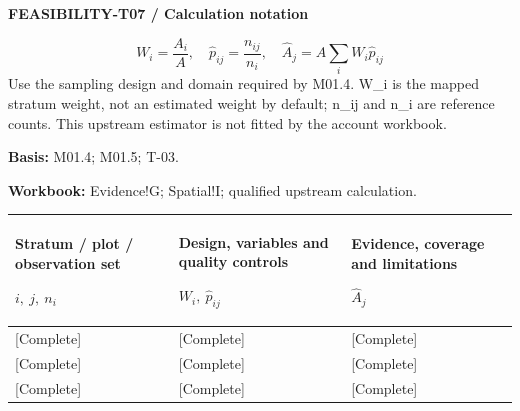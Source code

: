 \par\begingroup\sffamily\fontsize{8}{10}\selectfont\color{NEBGreen}\setlength{\parskip}{2pt}\setlength{\abovedisplayskip}{4pt}\setlength{\belowdisplayskip}{4pt}\setlength{\abovedisplayshortskip}{2pt}\setlength{\belowdisplayshortskip}{3pt}
\textbf{FEASIBILITY-T07 / Calculation notation}\par
{\fontsize{9}{11}\selectfont\[ W_i=\frac{A_i}{A},\quad \widehat p_{ij}=\frac{n_{ij}}{n_i},\quad \widehat A_j=A\sum_i W_i\widehat p_{ij} \]}
Use the sampling design and domain required by M01.4. W\_i is the mapped stratum weight, not an estimated weight by default; n\_ij and n\_i are reference counts. This upstream estimator is not fitted by the account workbook.\par
\textbf{Basis:} M01.4; M01.5; T-03.\par
\textbf{Workbook:} Evidence!G; Spatial!I; qualified upstream calculation.\par\endgroup
{\sffamily\fontsize{8.3}{10.3}\selectfont\begin{longtable}{@{}P{52.79mm} P{59.39mm} P{52.79mm}@{}}
\toprule
\textbf{Stratum / plot / observation set}\par {\normalfont\fontsize{8.2}{10}\selectfont $i,\ j,\ n_i$} & \textbf{Design, variables and quality controls}\par {\normalfont\fontsize{8.2}{10}\selectfont $W_i,\ \widehat p_{ij}$} & \textbf{Evidence, coverage and limitations}\par {\normalfont\fontsize{8.2}{10}\selectfont $\widehat A_j$}\\\midrule\endhead
\rule{0pt}{7.7mm}[Complete] & [Complete] & [Complete]\\\hline
\rule{0pt}{7.7mm}[Complete] & [Complete] & [Complete]\\\hline
\rule{0pt}{7.7mm}[Complete] & [Complete] & [Complete]\\\hline
\end{longtable}}
\par\begingroup\sffamily\fontsize{8}{10}\selectfont\color{NEBGreen}\setlength{\parskip}{2pt}\setlength{\abovedisplayskip}{4pt}\setlength{\belowdisplayskip}{4pt}\setlength{\abovedisplayshortskip}{2pt}\setlength{\belowdisplayshortskip}{3pt}
